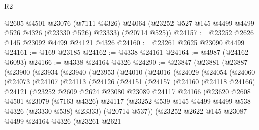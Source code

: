 \begin{lexlean}{R2}
\begin{coremodule}
      @2605
      @4501
      @23076
      (@7111 @4326)
      @24064
      (@23252 @527 @145 @4499 @4499 @526 @4326 (@23330 @526) @23333)
      (@20714 @525))
@24157 := @23252 @2626 @145 @23092 @4499 @24121 @4326
@24160 := @23261 @2625 @23090 @4499
@24161 := @169 @23185
@24162 := @4338 @24161
@24164 := @4987 (@24162 @6093)
@24166 := @4338 @24164 @4326
@24290 := @23847
    (@23881
      (@23887
        (@23900
          (@23934
            (@23940
              (@23953
                (@24010
                  (@24016
                    (@24029
                      (@24054
                        (@24060
                          (@24073
                            (@24107
                              (@24113
                                (@24126
                                  (@24151
                                    (@24157
                                      (@24160
                                        (@24118 @24166)
                                        @24121
                                        (@23252
                                          @2609
                                          @2624
                                          @23080
                                          @23089
                                          @24117
                                          @24166
                                          (@23620
                                            @2608
                                            @4501
                                            @23079
                                            (@7163 @4326)
                                            @24117
                                            (@23252
                                              @539
                                              @145
                                              @4499
                                              @4499
                                              @538
                                              @4326
                                              (@23330 @538)
                                              @23333)
                                            (@20714 @537))
                                          (@23252
                                            @2622
                                            @145
                                            @23087
                                            @4499
                                            @24164
                                            @4326
                                            (@23261
                                              @2621

\end{coremodule}
\end{lexlean}
